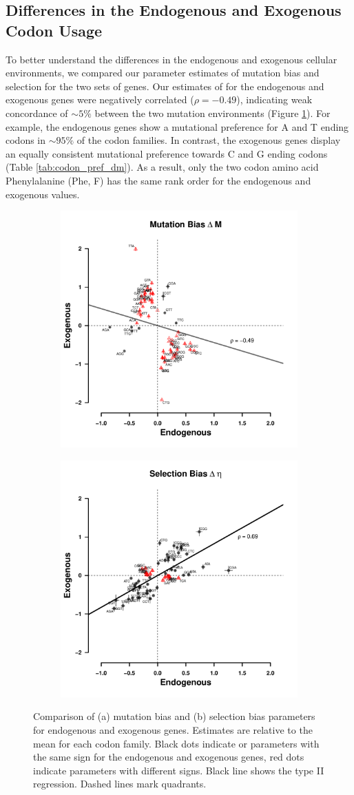 \documentclass[12pt]{article}
\begin{document}
\subsection*{Differences in the Endogenous and Exogenous Codon Usage}
To better understand the differences in the endogenous and exogenous cellular environments,  we compared our parameter estimates of mutation bias \DM and selection \DE for the two sets of genes.
Our estimates of \DM  for the endogenous and exogenous genes were negatively correlated ($\rho = -0.49$),  indicating weak concordance of $\sim5\%$ between the two mutation environments  (Figure \ref{fig:csp_comp}).
For example, the endogenous genes show a mutational preference for A and T ending codons in $\sim95\%$ of the codon families.
In contrast, the exogenous genes display an equally consistent mutational preference towards C and G ending codons  (Table \ref{tab:codon_pref_dm}).
As a result, only the two codon amino acid Phenylalanine (Phe, F) has the same rank order for the endogenous and exogenous \DM values.
\begin{figure}[h]
    \centering
    \begin{subfigure}
        \centering
        \includegraphics[width=.45\textwidth]{img/csp_corr_dm.pdf}
    \end{subfigure}
    \begin{subfigure}
        \centering
        \includegraphics[width=.45\textwidth]{img/csp_corr_deta.pdf}
    \end{subfigure}
    \caption{Comparison of (a) mutation bias \DM and (b) selection bias \DE parameters for endogenous and exogenous genes.
      Estimates are relative to the mean for each codon family.
      Black dots indicate \DM or \DE parameters with the same sign for the endogenous and exogenous genes, red dots indicate parameters with different signs.
      Black line shows the type II regression.
      Dashed lines mark quadrants.}
    \label{fig:csp_comp}
\end{figure}
\end{document}
